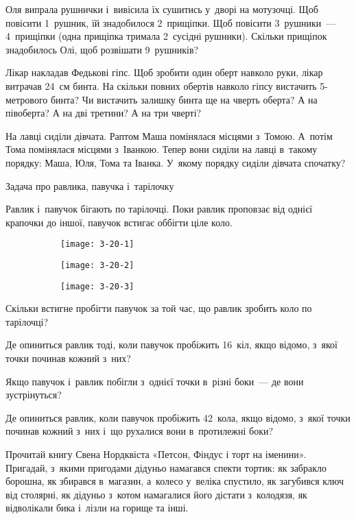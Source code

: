 \problem
Оля випрала рушнички і~вивісила їх сушитись у~дворі на мотузочці.
Щоб повісити 1~рушник, їй знадобилося 2~прищіпки.
Щоб повісити 3~рушники~--- 4~прищіпки (одна прищіпка тримала 2~сусідні рушники).
Скільки прищіпок знадобилось Олі, щоб розвішати 9~рушників?


\problem
Лікар накладав Федькові гіпс.
Щоб зробити один оберт навколо руки, лікар витрачав 24~см бинта.
На скільки повних обертів навколо гіпсу вистачить 5-метрового бинта?
Чи вистачить залишку бинта ще на чверть оберта?
А на півоберта?
А на дві третини?
А на три чверті?


\problem
На лавці сиділи дівчата. Раптом Маша помінялася місцями з~Томою.
А~потім Тома помінялася місцями з~Іванкою.
Тепер вони сиділи на лавці в~такому порядку: Маша, Юля, Тома та Іванка.
У~якому порядку сиділи дівчата спочатку?


\problem
Задача про равлика, павучка і~тарілочку

Равлик і~павучок бігають по тарілочці.
Поки равлик проповзає від однієї крапочки до іншої,
павучок встигає оббігти ціле коло.

\begin{figure}[h]
    \centering
    \begin{subfigure}{0.2\textwidth}
        \texttt{[image: 3-20-1]}
    \end{subfigure}
    \quad
    \begin{subfigure}{0.4\textwidth}
        \texttt{[image: 3-20-2]}
    \end{subfigure}
    \quad
    \begin{subfigure}{0.2\textwidth}
        \texttt{[image: 3-20-3]}
    \end{subfigure}
\end{figure}

Скільки встигне пробігти павучок за той час,
що равлик зробить коло по тарілочці?

Де опиниться равлик тоді, коли павучок пробіжить 16~кіл,
якщо відомо, з~якої точки починав кожний з~них?

Якщо павучок і~равлик побігли з~однієї точки в~різні боки~---
де вони зустрінуться?

Де опиниться равлик, коли павучок пробіжить 42~кола, якщо відомо,
з~якої точки починав кожний з~них і~що рухалися вони в~протилежні боки?


\problem
Прочитай книгу Свена Нордквіста «Петсон, Фіндус і торт на іменини». Пригадай,
з~якими пригодами дідуньо намагався спекти тортик: як забракло борошна,
як збирався в~магазин, а~колесо у~веліка спустило, як загубився ключ
від столярні, як дідуньо з~котом намагалися його дістати з~колодязя,
як відволікали бика і~лізли на горище та інші.

